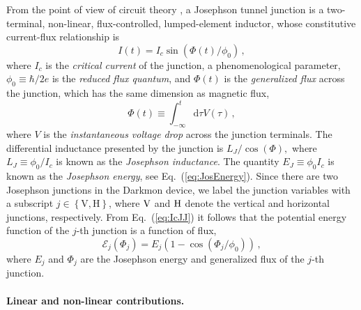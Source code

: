 From the point of view of circuit theory \citep{Yurke1984,Devoret1997,Girvin2014,Vool2017},
a Josephson tunnel junction \citep{Josephson1962} is a two-terminal,
non-linear, flux-controlled, lumped-element inductor, whose constitutive
current-flux relationship is 
\begin{equation}
I\left(t\right)=I_{c}\sin\left(\Phi\left(t\right)/\phi_{0}\right)\,,\label{eq:IcJJ}
\end{equation}
where $I_{c}$ is the \emph{critical current} of the junction, a phenomenological
parameter, $\phi_{0}\equiv\hbar/2e$ is the \emph{reduced flux quantum},
and $\Phi\left(t\right)$ is the\emph{ generalized flux} across the
junction, which has the same dimension as magnetic flux,
\begin{equation}
\Phi\left(t\right)\equiv\int_{-\infty}^{t}\mathrm{d}\tau V\left(\tau\right)\,,
\end{equation}
where $V$ is the \emph{instantaneous voltage} \emph{drop} across
the junction terminals. The differential inductance presented by the
junction is $L_{J}/\cos\left(\Phi\right),$ where $L_{J}\equiv\phi_{0}/I_{c}$
is known as the \emph{Josephson inductance}. The quantity $E_{J}\equiv\phi_{0}I_{c}$
is known as the\emph{ Josephson energy}, see Eq.~(\ref{eq:JosEnergy}).
Since there are two Josephson junctions in the Darkmon device, we
label the junction variables with a subscript $j\in\left\{ \mathrm{V,H}\right\} $,
where ${\rm V}$ and ${\rm H}$ denote the vertical and horizontal
junctions, respectively. From Eq.~(\ref{eq:IcJJ}) it follows that
the potential energy function of the $j$-th junction is a function
of flux, 
\begin{equation}
\mathcal{E}_{j}\left(\Phi_{j}\right)=E_{j}\left(1-\cos\left(\Phi_{j}/\phi_{0}\right)\right)\,,\label{eq:JosEnergy}
\end{equation}
where $E_{j}$ and $\Phi_{j}$ are the Josephson energy and generalized
flux of the $j$-th junction. 

\paragraph{Linear and non-linear contributions. }

